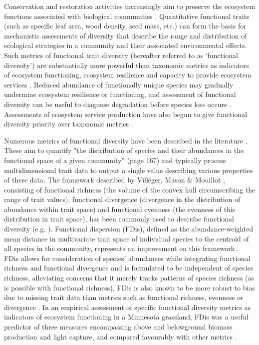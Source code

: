 \documentclass[openright,12pt,a4paper]{memoir}
\begin{document}
Conservation and restoration activities increasingly aim to preserve the ecosystem functions associated with biological communities \cite{Aerts2011, Cadotte2011, Montoya2012}. Quantitative functional traits (such as specific leaf area, wood density, seed mass, etc.) can form the basis for mechanistic assessments of diversity that describe the range and distribution of ecological strategies in a community and their associated environmental effects. Such metrics of functional trait diversity (hereafter referred to as ‘functional diversity’) are substantially more powerful than taxonomic metrics as indicators of ecosystem functioning, ecosystem resilience and capacity to provide ecosystem services \cite{Tilman1997, Diaz2001, Hooper2005}. Reduced abundance of functionally unique species may gradually undermine ecosystem resilience or functioning, and assessment of functional diversity can be useful to diagnose degradation before species loss occurs \cite{Mouillot2013}. Assessments of ecosystem service production have also begun to give functional diversity priority over taxonomic metrics \cite{Diaz2007}.
 
Numerous metrics of functional diversity have been described in the literature \cite{Schleuter2010, Mouillot2013}. These aim to quantify "the distribution of species and their abundances in the functional space of a given community” \cite{Mouillot2013}(page 167) and typically process multidimensional trait data to output a single value describing various properties of these data. The framework described by Villéger, Mason & Mouillot \cite{Villeger2008}, consisting of functional richness (the volume of the convex hull circumscribing the range of trait values), functional divergence (divergence in the distribution of abundance within trait space) and functional evenness (the evenness of this distribution in trait space), has been commonly used to describe functional diversity (e.g. \cite{Biswas2010, Pakeman2011, Savage2012, Clark2012}). Functional dispersion (FDis), defined as the abundance-weighted mean distance in multivariate trait space of individual species to the centroid of all species in the community, represents an improvement on this framework \cite{Laliberte2010}. FDis allows for consideration of species’ abundances while integrating functional richness and functional divergence and is formulated to be independent of species richness, alleviating concerns that it merely tracks patterns of species richness (as is possible with functional richness). FDis is also known to be more robust to bias due to missing trait data than metrics such as functional richness, evenness or divergence \cite{Pakeman2014}. In an empirical assessment of specific functional diversity metrics as indicators of ecosystem functioning in a Minnesota grassland, FDis was a useful predictor of three measures encompassing above and belowground biomass production and light capture, and compared favourably with other metrics \cite{Clark2012}.
\end{document}
